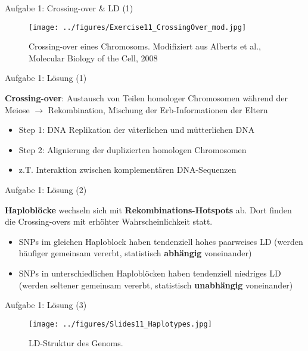 \documentclass{beamer}
\begin{document}
\begin{frame}{Aufgabe 1: Crossing-over \& LD (1)}
\begin{figure}[h]
\begin{center}
\texttt{[image: ../figures/Exercise11\_CrossingOver\_mod.jpg]}
\caption{Crossing-over eines Chromosoms. Modifiziert aus Alberts et al., Molecular Biology of the Cell, 2008}
\label{fig:CrossingOver}
\end{center}
\end{figure}
\end{frame}

\begin{frame}{Aufgabe 1: Lösung (1)}

\textbf{Crossing-over}: Austausch von Teilen homologer Chromosomen während der Meiose $\longrightarrow$ Rekombination, Mischung der Erb-Informationen der Eltern

\begin{itemize}
    \item Step 1: DNA Replikation der väterlichen und mütterlichen DNA
    \item Step 2: Alignierung der duplizierten homologen Chromosomen
    \item z.T. Interaktion zwischen komplementären DNA-Sequenzen 
\end{itemize}
\end{frame}

\begin{frame}{Aufgabe 1: Lösung (2)}

\textbf{Haploblöcke} wechseln sich mit \textbf{Rekombinations-Hotspots} ab. Dort finden die Crossing-overs mit erhöhter Wahrscheinlichkeit statt. 

\begin{itemize}
    \item SNPs im gleichen Haploblock haben tendenziell hohes paarweises LD (werden häufiger gemeinsam vererbt, statistisch \textbf{abhängig} voneinander)
    \item SNPs in unterschiedlichen Haploblöcken haben tendenziell niedriges LD (werden seltener gemeinsam vererbt, statistisch \textbf{unabhängig} voneinander) 
\end{itemize}
\end{frame}


\begin{frame}{Aufgabe 1: Lösung (3)}
\begin{figure}[h]
\begin{center}
\texttt{[image: ../figures/Slides11\_Haplotypes.jpg]}
\caption{LD-Struktur des Genoms.}
\label{fig:Haploblock}
\end{center}
\end{figure}
\end{frame}
\end{document}
